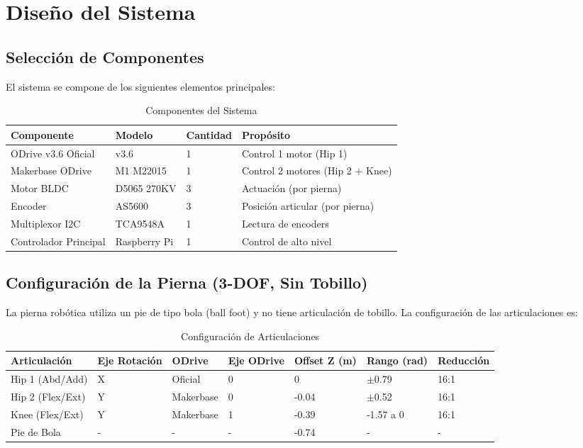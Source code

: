 \chapter{Diseño del Sistema}

\section{Selección de Componentes}

El sistema se compone de los siguientes elementos principales:

\begin{table}[h]
\centering
\caption{Componentes del Sistema}
\label{tab:componentes}
\begin{tabular}{llll}
\toprule
\textbf{Componente} & \textbf{Modelo} & \textbf{Cantidad} & \textbf{Propósito} \\
\midrule
ODrive v3.6 Oficial & v3.6 & 1 & Control 1 motor (Hip 1) \\
Makerbase ODrive & M1 M22015 & 1 & Control 2 motores (Hip 2 + Knee) \\
Motor BLDC & D5065 270KV & 3 & Actuación (por pierna) \\
Encoder & AS5600 & 3 & Posición articular (por pierna) \\
Multiplexor I2C & TCA9548A & 1 & Lectura de encoders \\
Controlador Principal & Raspberry Pi & 1 & Control de alto nivel \\
\bottomrule
\end{tabular}
\end{table}

\section{Configuración de la Pierna (3-DOF, Sin Tobillo)}

La pierna robótica utiliza un pie de tipo bola (ball foot) y no tiene articulación de tobillo. La configuración de las articulaciones es:

\begin{table}[h]
\centering
\caption{Configuración de Articulaciones}
\label{tab:articulaciones}
\begin{tabular}{lllllll}
\toprule
\textbf{Articulación} & \textbf{Eje Rotación} & \textbf{ODrive} & \textbf{Eje ODrive} & \textbf{Offset Z (m)} & \textbf{Rango (rad)} & \textbf{Reducción} \\
\midrule
Hip 1 (Abd/Add) & X & Oficial & 0 & 0 & $\pm$0.79 & 16:1 \\
Hip 2 (Flex/Ext) & Y & Makerbase & 0 & -0.04 & $\pm$0.52 & 16:1 \\
Knee (Flex/Ext) & Y & Makerbase & 1 & -0.39 & -1.57 a 0 & 16:1 \\
Pie de Bola & - & - & - & -0.74 & - & - \\
\bottomrule
\end{tabular}
\end{table}

